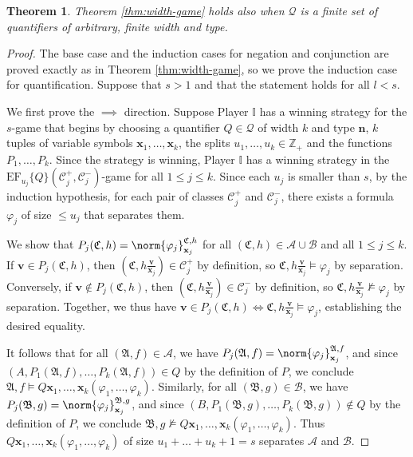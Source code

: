 \documentclass{article}
\newtheorem{theorem}{Theorem}[section]
\theoremstyle{definition}
\begin{document}
\begin{theorem}
    Theorem \ref{thm:width-game} holds also when $\mathcal{Q}$ is a finite set of quantifiers of arbitrary, finite width and type.
\end{theorem}
\begin{proof}
    The base case and the induction cases for negation and conjunction are proved exactly as in Theorem \ref{thm:width-game}, so we prove the induction case for quantification. Suppose that $s>1$ and that the statement holds for all $l<s$.

    We first prove the $\implies$ direction. Suppose Player $\mathbb{I}$ has a winning strategy for the $s$-game that begins by choosing a quantifier $Q\in\mathcal{Q}$ of width $k$ and type $\textbf{n}$, $k$ tuples of variable symbols $\textbf{x}_1,\dots,\textbf{x}_k$, the splits $u_1,\dots,u_k\in\mathbb{Z}_+$ and the functions $P_1,\dots,P_k$. Since the strategy is winning, Player $\mathbb{I}$ has a winning strategy in the $\mathrm{EF}_{u_j}\{Q\}(\mathcal{C}^+_j,\mathcal{C}^-_j)$-game for all $1 \leq j \leq k$. Since each $u_j$ is smaller than $s$, by the induction hypothesis, for each pair of classes $\mathcal{C}^+_j$ and $\mathcal{C}^-_j$, there exists a formula $\varphi_j$ of size $\leq u_j$ that separates them.

    We show that $P_j(\mathfrak{C},h)=\norm{\varphi_j}_{\textbf{x}_j}^{\mathfrak{C},h}$ for all $(\mathfrak{C},h)\in\mathcal{A}\cup\mathcal{B}$ and all $1 \leq j \leq k$. If $\textbf{v}\in P_j(\mathfrak{C},h)$, then $(\mathfrak{C},h\frac{\textbf{v}}{\textbf{x}_j})\in \mathcal{C}^+_j$ by definition, so $\mathfrak{C},h\frac{\textbf{v}}{\textbf{x}_j}\models\varphi_j$ by separation. Conversely, if $\textbf{v}\notin P_j(\mathfrak{C},h)$, then $(\mathfrak{C},h\frac{\textbf{v}}{\textbf{x}_j})\in \mathcal{C}^-_j$ by definition, so $\mathfrak{C},h\frac{\textbf{v}}{\textbf{x}_j}\not\models\varphi_j$ by separation. Together, we thus have $\textbf{v} \in P_j(\mathfrak{C},h)\iff \mathfrak{C},h\frac{\textbf{v}}{\textbf{x}_j}\models \varphi_j$, establishing the desired equality.

    It follows that for all $(\mathfrak{A},f)\in\mathcal{A}$, we have $P_j(\mathfrak{A},f)=\norm{\varphi_j}^{\mathfrak{A},f}_{\textbf{x}_j}$, and since $(A,P_1(\mathfrak{A},f),\dots,P_k(\mathfrak{A},f))\in Q$ by the definition of $P$, we conclude $\mathfrak{A},f\models Q\textbf{x}_1,\dots,\textbf{x}_k(\varphi_1,\dots,\varphi_k)$. Similarly, for all $(\mathfrak{B},g)\in\mathcal{B}$, we have $P_j(\mathfrak{B},g)=\norm{\varphi_j}^{\mathfrak{B},g}_{\textbf{x}_j}$, and since $(B,P_1(\mathfrak{B},g),\dots,P_k(\mathfrak{B},g))\notin Q$ by the definition of $P$, we conclude $\mathfrak{B},g\not\models Q\textbf{x}_1,\dots,\textbf{x}_k(\varphi_1,\dots,\varphi_k)$. Thus $Q\textbf{x}_1,\dots,\textbf{x}_k(\varphi_1,\dots,\varphi_k)$ of size $u_1+\dots+u_k+1=s$ separates $\mathcal{A}$ and $\mathcal{B}$.


\end{proof}
\end{document}
